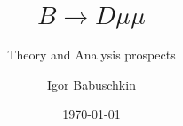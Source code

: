 \documentclass[compress,aspectratio=1610]{beamer}
\title{$B\to D\mu\mu$}
\subtitle{Theory and Analysis prospects}
\date{\today}
\institute{Rare Decay Working Group Meeting}
\author{Igor Babuschkin}
\begin{document}
\maketitle

\begin{frame}
\end{frame}
\end{document}
